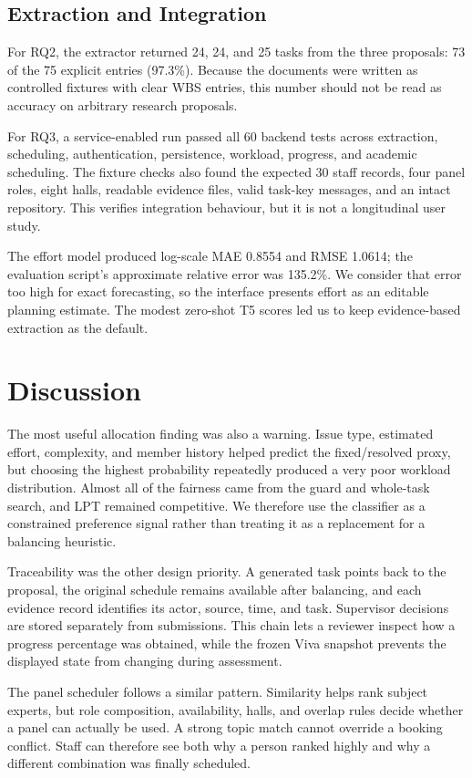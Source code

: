 \documentclass[conference]{IEEEtran}
\begin{document}
\subsection{Extraction and Integration}
For RQ2, the extractor returned 24, 24, and 25 tasks from the three proposals: 73 of the 75 explicit entries (97.3\%). Because the documents were written as controlled fixtures with clear WBS entries, this number should not be read as accuracy on arbitrary research proposals.

For RQ3, a service-enabled run passed all 60 backend tests across extraction, scheduling, authentication, persistence, workload, progress, and academic scheduling. The fixture checks also found the expected 30 staff records, four panel roles, eight halls, readable evidence files, valid task-key messages, and an intact repository. This verifies integration behaviour, but it is not a longitudinal user study.

The effort model produced log-scale MAE 0.8554 and RMSE 1.0614; the evaluation script's approximate relative error was 135.2\%. We consider that error too high for exact forecasting, so the interface presents effort as an editable planning estimate. The modest zero-shot T5 scores led us to keep evidence-based extraction as the default.

\section{Discussion}
The most useful allocation finding was also a warning. Issue type, estimated effort, complexity, and member history helped predict the fixed/resolved proxy, but choosing the highest probability repeatedly produced a very poor workload distribution. Almost all of the fairness came from the guard and whole-task search, and LPT remained competitive. We therefore use the classifier as a constrained preference signal rather than treating it as a replacement for a balancing heuristic.

Traceability was the other design priority. A generated task points back to the proposal, the original schedule remains available after balancing, and each evidence record identifies its actor, source, time, and task. Supervisor decisions are stored separately from submissions. This chain lets a reviewer inspect how a progress percentage was obtained, while the frozen Viva snapshot prevents the displayed state from changing during assessment.

The panel scheduler follows a similar pattern. Similarity helps rank subject experts, but role composition, availability, halls, and overlap rules decide whether a panel can actually be used. A strong topic match cannot override a booking conflict. Staff can therefore see both why a person ranked highly and why a different combination was finally scheduled.
\end{document}
